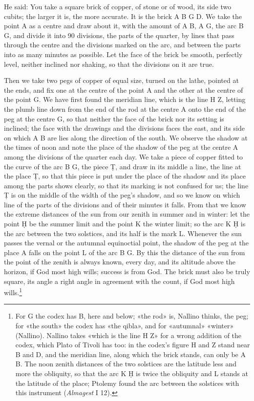 \documentclass[11pt]{article}
\newcommand{\ArPage}[1]{\marginpar{\footnotesize\color{gray}Ar.\,p.\,#1}}
\begin{document}
\par He said: You take a square brick of copper, of stone or of wood, its side two cubits; the larger it is, the more accurate. It is the brick A B G D. We take the point A as a centre and draw about it, with the amount of A B, A G, the arc B G, and divide it into 90 divisions, the parts of the quarter, by lines that pass through the centre and the divisions marked on the arc, and between the parts into as many minutes as possible. Let the face of the brick be smooth, perfectly level, neither inclined nor shaking, so that the divisions on it are true.\par
\par \ArPage{216}Then we take two pegs of copper of equal size, turned on the lathe, pointed at the ends, and fix one at the centre of the point A and the other at the centre of the point G. We have first found the meridian line, which is the line H Z, letting the plumb line down from the end of the rod at the centre A onto the end of the peg at the centre G, so that neither the face of the brick nor its setting is inclined; the face with the drawings and the divisions faces the east, and its side on which A B are lies along the direction of the south. We observe the shadow at the times of noon and note the place of the shadow of the peg at the centre A among the divisions of the quarter each day. We take a piece of copper fitted to the curve of the arc B G, the piece Ṭ, and draw in its middle a line, the line at the place Ṭ, so that this piece is put under the place of the shadow and its place among the parts shows clearly, so that its marking is not confused for us; the line Ṭ is on the middle of the width of the peg's shadow, and so we know on which line of the parts of the divisions and of their minutes it falls. From that we know the extreme distances of the sun from our zenith in summer and in winter: let the point Ḥ be the summer limit and the point K the winter limit; so the arc K Ḥ is the arc between the two solstices, and its half is the mark L. Whenever the sun passes the vernal or the autumnal equinoctial point, the shadow of the peg at the place A falls on the point L of the arc B G. By this the distance of the sun from the point of the zenith is always known, every day, and its altitude above the horizon, if God most high wills; success is from God. The brick must also be truly square, its angle a right angle in agreement with the count, if God most high wills.\footnote{For G the codex has B, here and below; «the rod» is, Nallino thinks, the peg; for «the south» the codex has «the qibla», and for «autumnal» «winter» (Nallino). Nallino takes «which is the line H Z» for a wrong addition of the codex, which Plato of Tivoli has too: in the codex's figure H and Z stand near B and D, and the meridian line, along which the brick stands, can only be A B. The noon zenith distances of the two solstices are the latitude less and more the obliquity, so that the arc K Ḥ is twice the obliquity and L stands at the latitude of the place; Ptolemy found the arc between the solstices with this instrument (\emph{Almagest} I 12).}\par
\end{document}
